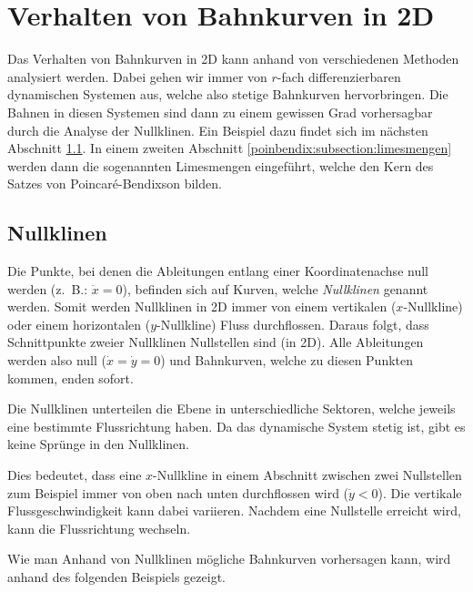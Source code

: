 \section{Verhalten von Bahnkurven in 2D} \label{poinbendix:section:nullklinen}

Das Verhalten von Bahnkurven in 2D kann anhand von verschiedenen Methoden analysiert werden.
Dabei gehen wir immer von $r$-fach differenzierbaren dynamischen Systemen aus, welche also stetige Bahnkurven hervorbringen.
Die Bahnen in diesen Systemen sind dann zu einem gewissen Grad vorhersagbar durch die Analyse der Nullklinen.
Ein Beispiel dazu findet sich im nächsten Abschnitt \ref{poinbendix:subsection:nullklinen}.
In einem zweiten Abschnitt \ref{poinbendix:subsection:limesmengen} werden dann die sogenannten Limesmengen eingeführt, welche den Kern des Satzes von Poincaré-Bendixson bilden.
%

\subsection{Nullklinen} \label{poinbendix:subsection:nullklinen}

Die Punkte, bei denen die Ableitungen entlang einer Koordinatenachse null
werden (z.~B.: $\dot{x}=0$), befinden sich auf Kurven, welche \emph{Nullklinen} genannt werden.
%
Somit werden Nullklinen in 2D immer von einem vertikalen ($x$-Nullkline) oder einem horizontalen ($y$-Nullkline) Fluss durchflossen.
Daraus folgt, dass Schnittpunkte zweier Nullklinen Nullstellen sind (in 2D).
Alle Ableitungen werden also null ($\dot{x}=\dot{y}=0$) und Bahnkurven, welche zu diesen Punkten kommen, enden sofort.

Die Nullklinen unterteilen die Ebene in unterschiedliche Sektoren, welche jeweils eine bestimmte Flussrichtung haben.
Da das dynamische System stetig ist, gibt es keine Sprünge in den Nullklinen.

Dies bedeutet, dass eine $x$-Nullkline in einem Abschnitt zwischen zwei Nullstellen zum Beispiel immer von oben nach unten durchflossen wird ($\dot{y} < 0$).
Die vertikale Flussgeschwindigkeit kann dabei variieren.
Nachdem eine Nullstelle erreicht wird, kann die Flussrichtung wechseln.

Wie man Anhand von Nullklinen mögliche Bahnkurven vorhersagen kann, wird anhand des folgenden Beispiels gezeigt.

